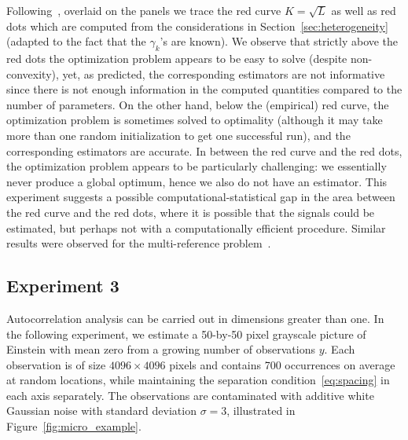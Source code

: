 \documentclass[12pt]{article}
\newcommand{\1}{\mathbf{1}}
\theoremstyle{plain}
\theoremstyle{definition}
\theoremstyle{remark}
\theoremstyle{plain}
\theoremstyle{remark}
\theoremstyle{plain}
\theoremstyle{plain}
\theoremstyle{plain}
\numberwithin{equation}{section}
\begin{document}
Following~\cite{boumal2017heterogeneous}, overlaid on the panels we trace the red curve $K = \sqrt{L}$ as well as red dots which are computed from the considerations in Section~\ref{sec:heterogeneity} (adapted to the fact that the $\gamma_k$'s are known). We observe that strictly above the red dots the optimization problem appears to be easy to solve (despite non-convexity), yet, as predicted, the corresponding estimators are not informative since there is not enough information in the computed quantities compared to the number of parameters. On the other hand, below the (empirical) red curve, the optimization problem is sometimes solved to optimality (although it may take more than one random initialization to get one successful run), and the corresponding estimators are accurate. In between the red curve and the red dots, the optimization problem appears to be particularly challenging: we essentially never produce a global optimum, hence we also do not have an estimator. This experiment suggests a possible computational-statistical gap in the area between the red curve and the red dots, where it is possible that the signals could be estimated, but perhaps not with a computationally efficient procedure.
Similar results were observed for the multi-reference problem~\cite{boumal2017heterogeneous,weinthesis,bandeira2017estimation}.

\subsection{Experiment 3}

Autocorrelation analysis can be carried out in dimensions greater than one. In the following experiment, we estimate 
a 50-by-50 pixel grayscale picture of Einstein with mean zero from a growing number of observations $y$. Each observation is of size $4096\times 4096$ pixels and contains 700 occurrences on average at random locations, while maintaining the separation condition~\eqref{eq:spacing} in each axis separately.
The observations are contaminated with additive white Gaussian noise with standard deviation $\sigma = 3$, illustrated in Figure~\ref{fig:micro_example}. 
\end{document}
